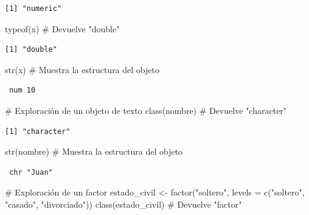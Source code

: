 \documentclass[
  spanish,
  a4paper,
  DIV=11,
  numbers=noendperiod,
  onepage,
  openany]{scrreprt}
\newenvironment{Shaded}{\begin{snugshade}}{\end{snugshade}}
\newcommand{\AttributeTok}[1]{\textcolor[rgb]{0.40,0.45,0.13}{#1}}
\newcommand{\CommentTok}[1]{\textcolor[rgb]{0.37,0.37,0.37}{#1}}
\newcommand{\FunctionTok}[1]{\textcolor[rgb]{0.28,0.35,0.67}{#1}}
\newcommand{\NormalTok}[1]{\textcolor[rgb]{0.00,0.23,0.31}{#1}}
\newcommand{\OtherTok}[1]{\textcolor[rgb]{0.00,0.23,0.31}{#1}}
\newcommand{\StringTok}[1]{\textcolor[rgb]{0.13,0.47,0.30}{#1}}
\begin{document}
\begin{verbatim}
[1] "numeric"
\end{verbatim}

\begin{Shaded}
\begin{Highlighting}[]
\FunctionTok{typeof}\NormalTok{(x)     }\CommentTok{\# Devuelve "double"}
\end{Highlighting}
\end{Shaded}

\begin{verbatim}
[1] "double"
\end{verbatim}

\begin{Shaded}
\begin{Highlighting}[]
\FunctionTok{str}\NormalTok{(x)        }\CommentTok{\# Muestra la estructura del objeto}
\end{Highlighting}
\end{Shaded}

\begin{verbatim}
 num 10
\end{verbatim}

\begin{Shaded}
\begin{Highlighting}[]
\CommentTok{\# Exploración de un objeto de texto}
\FunctionTok{class}\NormalTok{(nombre) }\CommentTok{\# Devuelve "character"}
\end{Highlighting}
\end{Shaded}

\begin{verbatim}
[1] "character"
\end{verbatim}

\begin{Shaded}
\begin{Highlighting}[]
\FunctionTok{str}\NormalTok{(nombre)   }\CommentTok{\# Muestra la estructura del objeto}
\end{Highlighting}
\end{Shaded}

\begin{verbatim}
 chr "Juan"
\end{verbatim}

\begin{Shaded}
\begin{Highlighting}[]
\CommentTok{\# Exploración de un factor}
\NormalTok{estado\_civil }\OtherTok{\textless{}{-}} \FunctionTok{factor}\NormalTok{(}\StringTok{"soltero"}\NormalTok{, }\AttributeTok{levels =} \FunctionTok{c}\NormalTok{(}\StringTok{"soltero"}\NormalTok{,}
                                             \StringTok{"casado"}\NormalTok{,}
                                             \StringTok{"divorciado"}\NormalTok{))}
\FunctionTok{class}\NormalTok{(estado\_civil)   }\CommentTok{\# Devuelve "factor"}
\end{Highlighting}
\end{Shaded}
\end{document}
